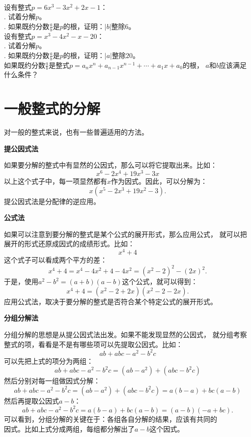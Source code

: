 \documentclass[12pt,UTF8]{ctexbook}
\begin{document}
\begin{xt}\label{xt:2-1-0}
    \mbox{}\\
    设有整式$p = 6x^3 - 3x^2 + 2x - 1$：\\
    . 试着分解$p$。\\
    . 如果既约分数$\frac{a}{b}$是$p$的根，证明：$|b|$整除$6$。\\
    设有整式$p = x^3 - 4x^2 - x - 20 $：\\
    . 试着分解$p$。\\
    . 如果既约分数$\frac{a}{b}$是$p$的根，证明：$|a|$整除$20$。\\
    如果既约分数$\frac{a}{b}$是整式$p = a_nx^n + a_{n-1}x^{n-1} + \cdots + a_1 x + a_0$的根，
    $a$和$b$应该满足什么条件？
\end{xt}

\section{一般整式的分解}
对一般的整式来说，也有一些普遍适用的方法。

\noindent \textbf{提公因式法}

\indent 如果要分解的整式中有显然的公因式，那么可以将它提取出来。比如：
$$ x^6 - 2x^4 + 19 x^3 -3x$$
\indent 以上这个式子中，每一项显然都有$x$作为因式。因此，可以分解为：
$$ x(x^5 - 2x^3 + 19x^2 - 3).$$
\indent 提公因式法是分配律的逆应用。

\noindent \textbf{公式法}

\indent 如果可以注意到要分解的整式是某个公式的展开形式，那么应用公式，
\indent 就可以把展开的形式还原成因式的成绩形式。比如： 
$$x^4 + 4$$
\indent 这个式子可以看成两个平方的差：
$$ x^4 + 4 = x^4 - 4x^2 + 4 - 4x^2 = (x^2 - 2)^2- (2x)^2.$$
\indent 于是，使用$a^2 - b^2 = (a + b)(a - b)$这个公式，就可以得到：
$$x^4 + 4 = (x^2 - 2 + 2x)(x^2 -2 -2x).$$
\indent 应用公式法，取决于要分解的整式是否符合某个特定公式的展开形式。

\noindent \textbf{分组分解法}

\indent 分组分解的思想是从提公因式法出发。如果不能发现显然的公因式，
\indent 就分组考察整式的项，看看是不是有哪些项可以先提取公因式。比如：
$$ ab + abc - a^2 - b^2c$$
\indent 可以先把上式的项分为两组：
$$ ab + abc - a^2 - b^2c = (ab - a^2) + (abc - b^2c)$$
\indent 然后分别对每一组做因式分解：
$$ ab + abc - a^2 - b^2c = (ab - a^2) + (abc - b^2c) = a(b - a) + bc(a - b)$$
\indent 然后再提取公因式$a - b$：
$$ ab + abc - a^2 - b^2c = a(b - a) + bc(a - b) = (a - b)(-a + bc).$$
\indent 可以看到，分组分解的关键在于：各组各自分解的结果，应该有共同的\\
\indent 因式。比如上式分成两组，每组都分解出了$a - b$这个因式。
\end{document}
